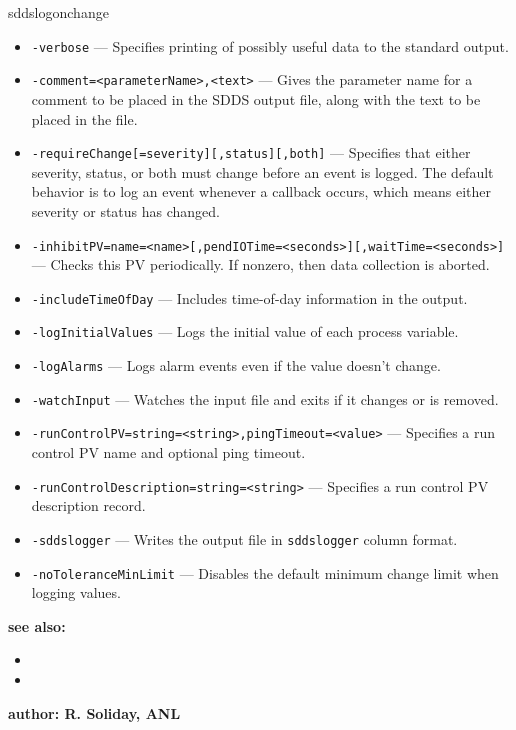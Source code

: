 \begin{sddsprog}{sddslogonchange}
\begin{itemize}
        \item {\tt -verbose} --- Specifies printing of possibly useful data to the standard output.
        \item {\tt -comment=<parameterName>,<text>} --- Gives the parameter name for a comment to be placed in the SDDS output file, along with the text to be placed in the file.
        \item {\tt -requireChange[=severity][,status][,both]} --- Specifies that either severity, status, or both must change before an event is logged.  The default behavior is to log an event whenever a callback occurs, which means either severity or status has changed.
        \item {\tt -inhibitPV=name=<name>[,pendIOTime=<seconds>][,waitTime=<seconds>]} --- Checks this PV periodically.  If nonzero, then data collection is aborted.
        \item {\tt -includeTimeOfDay} --- Includes time-of-day information in the output.
        \item {\tt -logInitialValues} --- Logs the initial value of each process variable.
        \item {\tt -logAlarms} --- Logs alarm events even if the value doesn't change.
        \item {\tt -watchInput} --- Watches the input file and exits if it changes or is removed.
        \item {\tt -runControlPV=string=<string>,pingTimeout=<value>} --- Specifies a run control PV name and optional ping timeout.
        \item {\tt -runControlDescription=string=<string>} --- Specifies a run control PV description record.
        \item {\tt -sddslogger} --- Writes the output file in \verb+sddslogger+ column format.
        \item {\tt -noToleranceMinLimit} --- Disables the default minimum change limit when logging values.
    \end{itemize}

\item {\bf see also:}
    \begin{itemize}
%
%
    \item {}
    \item {}
    \end{itemize}
%
%
\item {\bf author: R. Soliday, ANL} 
\end{sddsprog}
